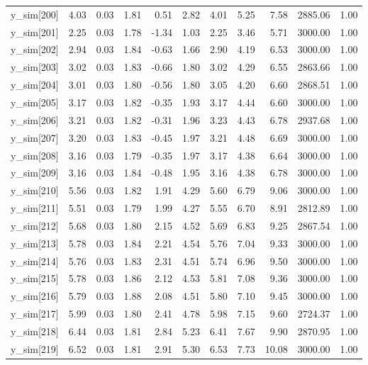 \begin{table}[ht]
\begin{tabular}{rrrrrrrrrrr}
  y\_sim[200] & 4.03 & 0.03 & 1.81 & 0.51 & 2.82 & 4.01 & 5.25 & 7.58 & 2885.06 & 1.00 \\ 
  y\_sim[201] & 2.25 & 0.03 & 1.78 & -1.34 & 1.03 & 2.25 & 3.46 & 5.71 & 3000.00 & 1.00 \\ 
  y\_sim[202] & 2.94 & 0.03 & 1.84 & -0.63 & 1.66 & 2.90 & 4.19 & 6.53 & 3000.00 & 1.00 \\ 
  y\_sim[203] & 3.02 & 0.03 & 1.83 & -0.66 & 1.80 & 3.02 & 4.29 & 6.55 & 2863.66 & 1.00 \\ 
  y\_sim[204] & 3.01 & 0.03 & 1.80 & -0.56 & 1.80 & 3.05 & 4.20 & 6.60 & 2868.51 & 1.00 \\ 
  y\_sim[205] & 3.17 & 0.03 & 1.82 & -0.35 & 1.93 & 3.17 & 4.44 & 6.60 & 3000.00 & 1.00 \\ 
  y\_sim[206] & 3.21 & 0.03 & 1.82 & -0.31 & 1.96 & 3.23 & 4.43 & 6.78 & 2937.68 & 1.00 \\ 
  y\_sim[207] & 3.20 & 0.03 & 1.83 & -0.45 & 1.97 & 3.21 & 4.48 & 6.69 & 3000.00 & 1.00 \\ 
  y\_sim[208] & 3.16 & 0.03 & 1.79 & -0.35 & 1.97 & 3.17 & 4.38 & 6.64 & 3000.00 & 1.00 \\ 
  y\_sim[209] & 3.16 & 0.03 & 1.84 & -0.48 & 1.95 & 3.16 & 4.38 & 6.78 & 3000.00 & 1.00 \\ 
  y\_sim[210] & 5.56 & 0.03 & 1.82 & 1.91 & 4.29 & 5.60 & 6.79 & 9.06 & 3000.00 & 1.00 \\ 
  y\_sim[211] & 5.51 & 0.03 & 1.79 & 1.99 & 4.27 & 5.55 & 6.70 & 8.91 & 2812.89 & 1.00 \\ 
  y\_sim[212] & 5.68 & 0.03 & 1.80 & 2.15 & 4.52 & 5.69 & 6.83 & 9.25 & 2867.54 & 1.00 \\ 
  y\_sim[213] & 5.78 & 0.03 & 1.84 & 2.21 & 4.54 & 5.76 & 7.04 & 9.33 & 3000.00 & 1.00 \\ 
  y\_sim[214] & 5.76 & 0.03 & 1.83 & 2.31 & 4.51 & 5.74 & 6.96 & 9.50 & 3000.00 & 1.00 \\ 
  y\_sim[215] & 5.78 & 0.03 & 1.86 & 2.12 & 4.53 & 5.81 & 7.08 & 9.36 & 3000.00 & 1.00 \\ 
  y\_sim[216] & 5.79 & 0.03 & 1.88 & 2.08 & 4.51 & 5.80 & 7.10 & 9.45 & 3000.00 & 1.00 \\ 
  y\_sim[217] & 5.99 & 0.03 & 1.80 & 2.41 & 4.78 & 5.98 & 7.15 & 9.60 & 2724.37 & 1.00 \\ 
  y\_sim[218] & 6.44 & 0.03 & 1.81 & 2.84 & 5.23 & 6.41 & 7.67 & 9.90 & 2870.95 & 1.00 \\ 
  y\_sim[219] & 6.52 & 0.03 & 1.81 & 2.91 & 5.30 & 6.53 & 7.73 & 10.08 & 3000.00 & 1.00 \\ 

\end{tabular}
\end{table}
